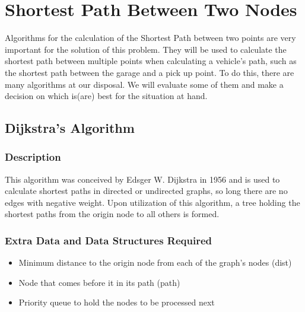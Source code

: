 \section{Shortest Path Between Two Nodes}

Algorithms for the calculation of the Shortest Path between two points are very important for the solution of this problem. They will be used to calculate the shortest path between multiple points when calculating a vehicle's path, such as the shortest path between the garage and a pick up point. To do this, there are many algorithms at our disposal. We will evaluate some of them and make a decision on which is(are) best for the situation at hand.


\subsection{Dijkstra's Algorithm}

\subsubsection{Description}
This algorithm was conceived by Edsger W. Dijkstra in 1956 and is used to calculate shortest paths in directed or undirected graphs, so long there are no edges with negative weight. Upon utilization of this algorithm, a tree holding the shortest paths from the origin node to all others is formed. 

\subsubsection{Extra Data and Data Structures Required}
\begin{itemize}
    \item Minimum distance to the origin node from each of the graph's nodes (dist)
    \item Node that comes before it in its path (path)
    \item Priority queue to hold the nodes to be processed next
\end{itemize}



